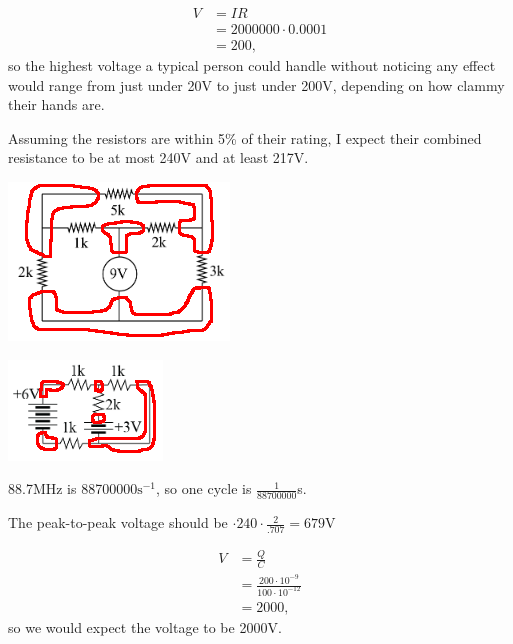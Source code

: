 \documentclass{article}
\newcommand{\inv}{^{-1}}
\begin{document}
\pagecolor{black}
\color{white}

\begin{align*}
    V &= IR \\
      &= 2000000 \cdot 0.0001 \\
      &= 200,
\end{align*} so the highest voltage a typical person could handle without noticing any effect would range from just under 20V to just under 200V, depending on how clammy their hands are.

\medskip
{}

    Assuming the resistors are within 5\% of their rating, I expect their combined resistance to be at most 240V and at least 217V.

\medskip
{}

    \begin{center}
    \includegraphics{hw2-circuit1.png}
    \end{center}

\medskip
{}

    \begin{center}
    \includegraphics[scale=1.4]{hw2-circuit2.png}
    \end{center}

\medskip
{}

    88.7MHz is 88700000$\text{s}\inv$, so one cycle is $\frac1{88700000}$s.

\medskip
{}

    The peak-to-peak voltage should be $\cdot 240 \cdot \frac2{.707} = 679$V

\medskip
{}
\begin{align*}
    V &= \frac QC \\
      &= \frac{200 \cdot 10^{-9}}{100 \cdot 10^{-12}} \\
      &= 2000,
\end{align*} so we would expect the voltage to be 2000V.
\end{document}
